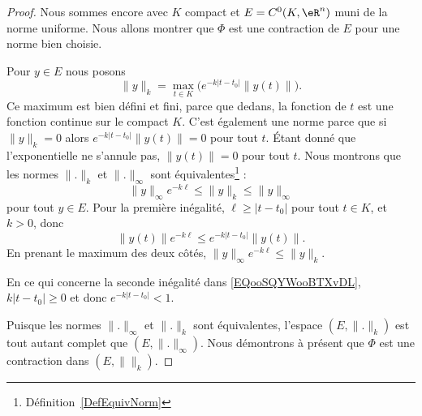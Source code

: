 \begin{proof}
	Nous sommes encore avec \( K\) compact et \( E=C^0(K,\eR^n)\) muni de la norme uniforme. Nous allons montrer que \( \Phi\) est une contraction de \( E\) pour une norme bien choisie.

	\begin{subproof}
		Pour \( y\in E\) nous posons
		\begin{equation}
			\| y \|_k=\max_{t\in K}\big(  e^{-k| t-t_0 |}\| y(t) \| \big).
		\end{equation}
		Ce maximum est bien défini et fini, parce que dedans, la fonction de \( t\) est une fonction continue sur le compact \( K\). C'est également une norme parce que si \( \| y \|_k=0\) alors \(  e^{-k| t-t_0 |}\| y(t) \|=0\) pour tout \( t\). Étant donné que l'exponentielle ne s'annule pas, \( \| y(t) \|=0\) pour tout \( t\).
		Nous montrons que les normes \( \| . \|_k\) et \( \| . \|_{\infty}\) sont équivalentes\footnote{Définition~\ref{DefEquivNorm}} :
		\begin{equation}        \label{EQooSQYWooBTXvDL}
			\| y \|_{\infty} e^{-k\ell}\leq \| y \|_k\leq \| y \|_{\infty}
		\end{equation}
		pour tout \( y\in E\). Pour la première inégalité, \( \ell\geq | t-t_0 |\) pour tout \( t\in K\), et \( k>0\), donc
		\begin{equation}
			\| y(t) \| e^{-k\ell}\leq  e^{-k| t-t_0 |}\| y(t) \|.
		\end{equation}
		En prenant le maximum des deux côtés, \( \| y \|_{\infty} e^{-k\ell}\leq \| y \|_k\).

		En ce qui concerne la seconde inégalité dans \eqref{EQooSQYWooBTXvDL}, \( k| t-t_0 |\geq 0\) et donc \(  e^{-k| t-t_0 |}<1\).

	\end{subproof}
	Puisque les normes \( \| . \|_{\infty}\) et \( \| . \|_k\) sont équivalentes, l'espace \( (E,\| . \|_k)\) est tout autant complet que \( (E,\| . \|_{\infty})\). Nous démontrons à présent que \( \Phi\) est une contraction dans \( (E,\|  \|_k)\).


\end{proof}
